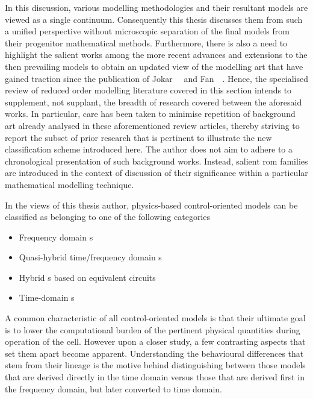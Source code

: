 In this discussion,  various modelling methodologies and  their resultant models
are viewed as  a single continuum. Consequently this thesis  discusses them from
such a  unified perspective without  microscopic separation of the  final models
from their progenitor mathematical methods. Furthermore, there is also a need to
highlight the salient works among the more recent advances and extensions to the
then  prevailing models  to obtain  an updated  view of  the modelling  art that
have  gained  traction  since the  publication  of  Jokar~\etal~\cite{Jokar2016}
and  Fan~\etal~\cite{Fan2015}. Hence,  the specialised  review of  reduced order
modelling  literature  covered  in  this  section  intends  to  supplement,  not
supplant,  the breadth  of  research  covered between  the  aforesaid works.  In
particular, care has been taken to minimise repetition of background art already
analysed in these aforementioned review articles, thereby striving to report the
subset of prior research that is  pertinent to illustrate the new classification
scheme introduced  here. The author  does not aim  to adhere to  a chronological
presentation of such  background works. Instead, salient  \gls{rom} families are
introduced  in  the  context  of  discussion  of  their  significance  within  a
particular mathematical modelling technique.


In the views of this thesis author, physics-based control-oriented models can be
classified as belonging to one of the following categories
\begin{itemize}
    \item Frequency domain s
    \item Quasi-hybrid time/frequency domain s
    \item Hybrid s based on equivalent circuits
    \item Time-domain s
\end{itemize}
A common characteristic of all control-oriented models is that their ultimate
goal is to lower the computational burden of the pertinent physical quantities
during operation of the cell.  However upon a closer study, a few contrasting
aspects that set them apart become apparent. Understanding the behavioural
differences that stem from their lineage is the motive behind distinguishing
between those models that are derived directly in the time  domain versus  those
that  are derived first  in the  frequency domain, but  later  converted  to
time  domain.

